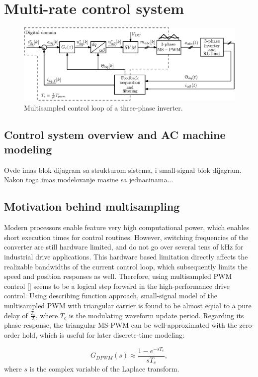 \documentclass[journal]{IEEEtran}
\begin{document}
\section{Multi-rate control system}

\begin{figure}[t!]
    \centerline{\includegraphics[width=0.95\linewidth]{figures/schematic.eps}}
    \caption{Multisampled control loop of a three-phase inverter.}
    \label{fig:MSControl}
\end{figure}

\subsection{Control system overview and AC machine modeling}
Ovde imas blok dijagram sa strukturom sistema, i small-signal blok dijagram. Nakon toga imas modelovanje masine sa jednacinama...


\subsection{Motivation behind multisampling}
Modern processors enable feature very high computational power, which enables short execution times for control routines. However, switching frequencies of the converter are still hardware limited, and do not go over several tens of kHz for industrial drive applications. This hardware based limitation directly affects the realizable bandwidths of the current control loop, which subsequently limits the speed and position responses as well. Therefore, using multisampled PWM control [] seems to be a logical step forward in the high-performance drive control. 
Using describing function approach, small-signal model of the multisampled PWM with triangular carrier is found to be almost equal to a pure delay of $\frac{T_c}{2}$, where $T_c$ is the modulating waveform update period. Regarding its phase response, the triangular MS-PWM can be well-approximated with the zero-order hold, which is useful for later discrete-time modeling: 

\begin{equation}
G_{DPWM}(s) \approx \frac{1-e^{-sT_c}}{sT_c}, 
\label{eq:DPWM_model}  
\end{equation}
where $s$ is the complex variable of the Laplace transform.
\end{document}
